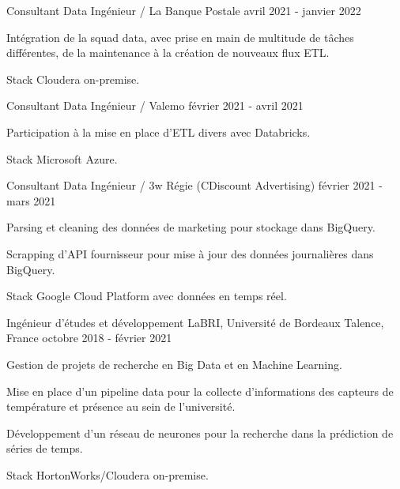 \begin{cventries}
	\cventry
	{Consultant Data Ingénieur / La Banque Postale}{}{}
	{avril 2021 - janvier 2022}
	{
		\begin{cvitems}
			\item Intégration de la squad data, avec prise en main de multitude de tâches différentes, de la maintenance à la création de nouveaux flux ETL.
			\item Stack Cloudera on-premise.
		\end{cvitems}
	}
	
	\cventry
	{Consultant Data Ingénieur / Valemo}{}{}
	{février 2021 - avril 2021}
	{
		\begin{cvitems}
			\item Participation à la mise en place d'ETL divers avec Databricks.
			\item Stack Microsoft Azure.
		\end{cvitems}
	}
	
	\cventry
	{Consultant Data Ingénieur / 3w Régie (CDiscount Advertising)}{}{}
	{février 2021 - mars 2021}
	{
		\begin{cvitems}
			\item Parsing et cleaning des données de marketing pour stockage dans BigQuery.
			\item Scrapping d'API fournisseur pour mise à jour des données journalières dans BigQuery.
			\item Stack Google Cloud Platform avec données en temps réel.
		\end{cvitems}
	}
	
	\cventry
	{Ingénieur d'études et développement}
	{LaBRI, Université de Bordeaux}
	{Talence, France}
	{octobre 2018 - février 2021}
	{
		\begin{cvitems}
			\item Gestion de projets de recherche en Big Data et en Machine Learning.
			\item Mise en place d'un pipeline data pour la collecte d'informations des capteurs de température et présence au sein de l'université.
			\item Développement d'un réseau de neurones pour la recherche dans la prédiction de séries de temps.
			\item Stack HortonWorks/Cloudera on-premise.
		\end{cvitems}
	}
	
\end{cventries}